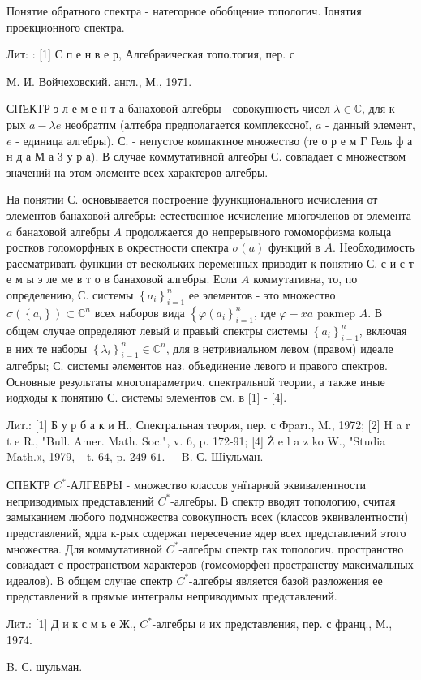 \documentclass[10pt]{article}
\begin{document}
Понятие обратного спектра - натегорное обобщение топологич. Іонятия проекционного спектра.



Лит: : [1] С п е н в е р, Алгебраическая топо.тогия, пер. с

М. И. Войчеховский. англ., М., 1971.



СП̈ЕКТР э л е м е н т а банаховой алгебры - совокупность чисел $\lambda \in \mathbb{C}$, для к-рых $a-\lambda e$ необратпм (алтебра предполагается комплекссної, $a$ - данный элемент, $e$ - единица алгебры). С. - непустое компактное множество (те о р е м Г Гель ф а н д а М а 3 у р а). В случае коммутативной алгео̆ры С. совпадает с множеством значений на этом әлементе всех характеров алгебры.



На понятии С. основывается построение фуункционального исчисления от элементов банаховой алгебры: естественное исчисление многочленов от элемента $a$ банаховой алгебры $A$ продолжается до непрерывного гомоморфизма кольца ростков голоморфных в окрестности спектра $\sigma(a)$ функций в $A$. Необходимость рассматривать функции от вескольких переменных приводит к понятию С. с и с т е м ы э ле ме в т о в банаховой алгебры. Если $A$ коммутативна, то, по определению, С. системы $\left\{a_{i}\right\}_{i=1}^{n}$ ее элементов - это множество $\sigma\left(\left\{a_{i}\right\}\right) \subset \mathbb{C}^{n}$ всех наборов вида $\left\{\varphi\left(a_{i}\right\}_{i=1}^{n}\right.$, где $\varphi-x a$ paкmep $A$. В общем случае определяют левый и правый спектры системы $\left\{a_{i}\right\}_{i=1}^{n}$, включая в них те наборы $\left\{\lambda_{i}\right\}_{i=1}^{n} \in \mathbb{C}^{n}$, для в нетривиальном левом (правом) идеале алгебры; С. системы әлементов наз. объединение левого и правого спектров. Основные результаты многопараметрич. спектральной теории, а также иные иодходы к понятию С. системы элементов см. в [1] - [4].



Лит.: [1] Б у р б а к и Н., Спектральная теория, пер. с Фparı., M., 1972; [2] H a r t e R., "Bull. Amer. Math. Soc.", v. 6, p. 172-91; [4] Ż e l a z ko W., "Studia Math.», 1979, $\begin{array}{ll}\text { t. 64, p. 249-61. } & \text { B. С. Шіульман. }\end{array}$



СПЕКТР $C^{*}$-АЛГЕБРЫ - множество классов унїтарной эквивалентности неприводимых представлений $C^{*}$-алгебры. В спектр вводят топологию, считая замыканием любого подмножества совокупность всех (классов эквивалентности) представлений, ядра к-рых содержат пересечение ядер всех представлений этого множества. Для коммутативной $C^{*}$-алгебры спектр гак топологич. пространство совиадает с пространством характеров (гомеоморфен пространству максимальных идеалов). В общем случае спектр $C^{*}$-алгебры является базой разложения ее представлений в прямые интегралы неприводимых представлений.



Лит.: [1] Д и к с м ь е Ж., $C^{*}$-алгебры и их представления, пер. с франц., М., 1974.



B. С. шульман.
\end{document}
